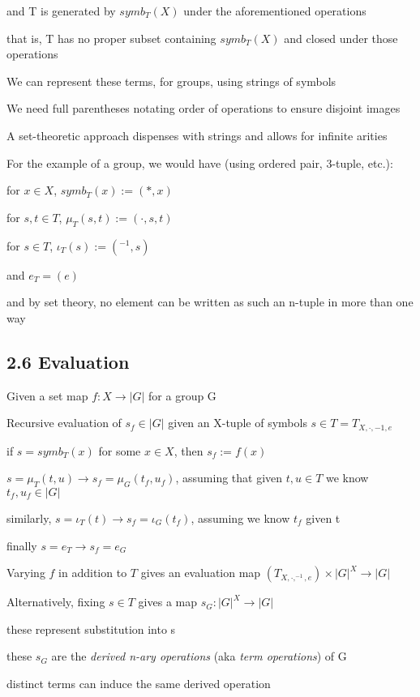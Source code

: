 \documentclass[12pt]{article}
\begin{document}
and T is generated by $symb_T(X)$ under the aforementioned operations

that is, T has no proper subset containing $symb_T(X)$ and closed under those operations

\noindent
We can represent these terms, for groups, using strings of symbols

We need full parentheses notating order of operations to ensure disjoint images

\noindent
A set-theoretic approach dispenses with strings and allows for infinite arities

\noindent
For the example of a group, we would have (using ordered pair, 3-tuple, etc.):

for $x \in X$, $symb_T(x) := (*, x)$

for $s, t \in T$, $\mu_T(s, t) := (\cdot, s, t)$

for $s \in T$, $\iota_T(s) := (^{-1}, s)$

and $e_T = (e)$

and by set theory, no element can be written as such an n-tuple in more than one way

\subsection{2.6 Evaluation}

\noindent
Given a set map $f: X \to |G|$ for a group G

\noindent
Recursive evaluation of $s_f \in |G|$ given an X-tuple of symbols $s \in T = T_{X, \cdot, -1, e}$

if $s= symb_T(x)$ for some $x \in X$, then $s_f := f(x)$

$s = \mu_T(t, u) \to s_f = \mu_G(t_f, u_f)$, assuming that given $t, u \in T$ we know $t_f, u_f \in |G|$

similarly, $s = \iota_T(t) \to s_f = \iota_G(t_f)$, assuming we know $t_f$ given t

finally $s = e_T \to s_f = e_G$

\noindent
Varying $f$ in addition to $T$ gives an evaluation map $(T_{X, \cdot, ^{-1}, e}) \times |G|^X \to |G|$

\noindent
Alternatively, fixing $s \in T$ gives a map $s_G: |G|^X \to |G|$

these represent substitution into s

these $s_G$ are the \textit{derived n-ary operations} (aka \textit{term operations}) of G

distinct terms can induce the same derived operation
\end{document}
